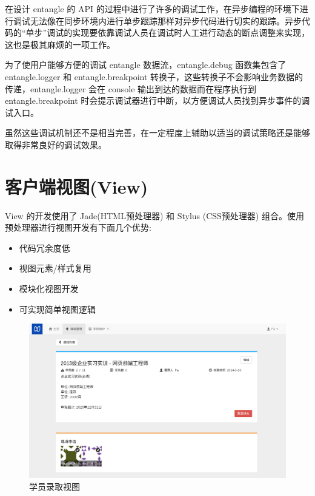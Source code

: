 在设计 entangle 的 API 的过程中进行了许多的调试工作，在异步编程的环境下进行调试无法像在同步环境内进行单步跟踪那样对异步代码进行切实的跟踪。异步代码的“单步”调试的实现要依靠调试人员在调试时人工进行动态的断点调整来实现，这也是极其麻烦的一项工作。

为了使用户能够方便的调试 entangle 数据流，entangle.debug 函数集包含了 entangle.logger 和 entangle.breakpoint 转换子，这些转换子不会影响业务数据的传递，entangle.logger 会在 console 输出到达的数据而在程序执行到 entangle.breakpoint 时会提示调试器进行中断，以方便调试人员找到异步事件的调试入口。

虽然这些调试机制还不是相当完善，在一定程度上辅助以适当的调试策略还是能够取得非常良好的调试效果。

\section{客户端视图(View)}

View 的开发使用了 Jade(HTML预处理器) 和 Stylus (CSS预处理器) 组合。使用预处理器进行视图开发有下面几个优势:

\begin{itemize}
  \item 代码冗余度低
  \item 视图元素/样式复用
  \item 模块化视图开发
  \item 可实现简单视图逻辑
\end{itemize}

\begin{figure}[!h]
  \begin{center}
    \includegraphics[scale=0.3]{figures/screenshot/enroll.png}
    \caption{学员录取视图\label{SSEnroll}}
  \end{center}
\end{figure}

